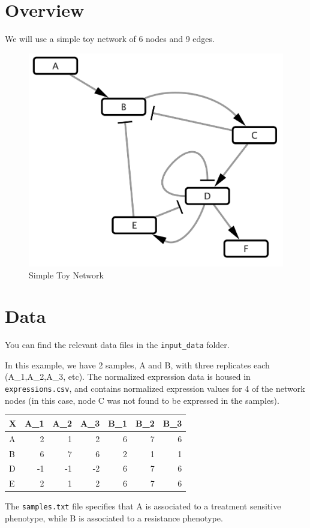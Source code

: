 \documentclass[
]{book}
\begin{document}
\hypertarget{overview}{%
\section{Overview}\label{overview}}

We will use a simple toy network of 6 nodes and 9 edges.

\begin{figure}

{\centering \includegraphics[width=0.5\linewidth]{images/toy_network} 

}

\caption{Simple Toy Network}\label{fig:unnamed-chunk-3}
\end{figure}

\hypertarget{data}{%
\section{Data}\label{data}}

You can find the relevant data files in the \texttt{input\_data} folder.

In this example, we have 2 samples, A and B, with three replicates each (A\_1,A\_2,A\_3, etc).
The normalized expression data is housed in \texttt{expressions.csv}, and contains normalized expression values for 4 of the network nodes (in this case, node C was not found to be expressed in the samples).

\begin{tabular}{l|r|r|r|r|r|r}
\hline
X & A\_1 & A\_2 & A\_3 & B\_1 & B\_2 & B\_3\\
\hline
A & 2 & 1 & 2 & 6 & 7 & 6\\
\hline
B & 6 & 7 & 6 & 2 & 1 & 1\\
\hline
D & -1 & -1 & -2 & 6 & 7 & 6\\
\hline
E & 2 & 1 & 2 & 6 & 7 & 6\\
\hline
\end{tabular}

The \texttt{samples.txt} file specifies that A is associated to a treatment sensitive phenotype, while B is associated to a resistance phenotype.
\end{document}

